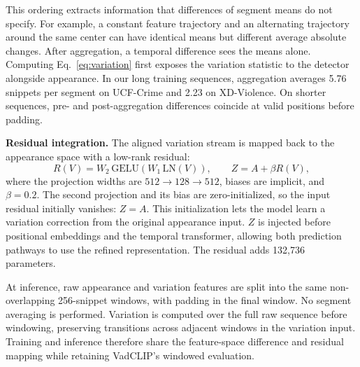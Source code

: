 This ordering extracts information that differences of segment means do not specify. For example, a constant feature trajectory and an alternating trajectory around the same center can have identical means but different average absolute changes. After aggregation, a temporal difference sees the means alone. Computing Eq.~\eqref{eq:variation} first exposes the variation statistic to the detector alongside appearance. In our long training sequences, aggregation averages 5.76 snippets per segment on UCF-Crime and 2.23 on XD-Violence. On shorter sequences, pre- and post-aggregation differences coincide at valid positions before padding.

\textbf{Residual integration.}
The aligned variation stream is mapped back to the appearance space with a low-rank residual:
\begin{equation}
 R(V)=W_2\,\mathrm{GELU}\!\left(W_1\,\mathrm{LN}(V)\right),
 \qquad Z=A+\beta R(V),
 \label{eq:residual}
\end{equation}
where the projection widths are $512\rightarrow128\rightarrow512$, biases are implicit, and $\beta=0.2$. The second projection and its bias are zero-initialized, so the input residual initially vanishes: $Z=A$. This initialization lets the model learn a variation correction from the original appearance input. $Z$ is injected before positional embeddings and the temporal transformer, allowing both prediction pathways to use the refined representation. The residual adds 132,736 parameters.

At inference, raw appearance and variation features are split into the same non-overlapping 256-snippet windows, with padding in the final window. No segment averaging is performed. Variation is computed over the full raw sequence before windowing, preserving transitions across adjacent windows in the variation input. Training and inference therefore share the feature-space difference and residual mapping while retaining VadCLIP's windowed evaluation.

